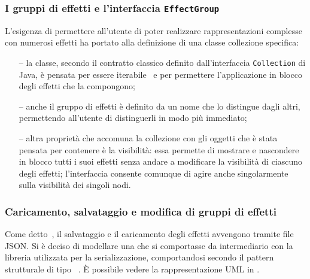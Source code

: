             \subsubsection{I gruppi di effetti e l'interfaccia \texttt{EffectGroup}}\label{subsub:effectGroup}
                L'esigenza di permettere all'utente di poter realizzare rappresentazioni complesse con numerosi effetti ha portato alla definizione di una classe collezione specifica:
                \begin{itemize}
                    \item[--]\label{itm:eFXgIterator} la classe, secondo il contratto classico definito dall'interfaccia \texttt{Collection} di Java, è pensata per essere iterabile~\cite{iterator} e per permettere l'applicazione in blocco degli effetti che la compongono;

                    \item[--]\label{itm:eFXgName} anche il gruppo di effetti è definito da un nome che lo distingue dagli altri, permettendo all'utente di distinguerli in modo più immediato;

                    \item[--]\label{itm:eFXgVis} altra proprietà che accomuna la collezione con gli oggetti che è stata pensata per contenere è la visibilità: essa permette di mostrare e nascondere in blocco tutti i suoi effetti senza andare a modificare la visibilità di ciascuno degli effetti; l'interfaccia consente comunque di agire anche singolarmente sulla visibilità dei singoli nodi.

                \end{itemize}

            \subsubsection{Caricamento, salvataggio e modifica di gruppi di effetti}\label{subsub:serializzazione}
                Come detto~, il salvataggio e il caricamento degli effetti avvengono tramite file JSON. Si è deciso di modellare una  che si comportasse da intermediario con la libreria utilizzata per la serializzazione, comportandosi secondo il pattern strutturale di tipo ~\cite{designPattern}. È possibile vedere la rappresentazione UML in .

